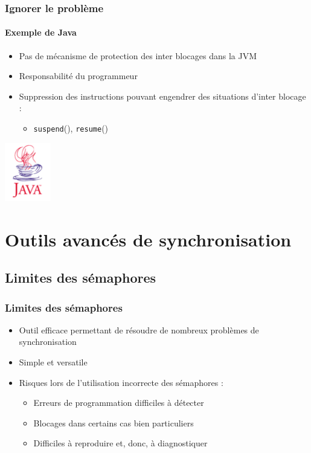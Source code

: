 \begin{frame}
\frametitle{Ignorer le problème}
\framesubtitle{Exemple de Java}
\begin{itemize}
\item Pas de mécanisme de protection des inter blocages dans la JVM
\item Responsabilité du programmeur
\item Suppression des instructions pouvant engendrer des situations d’inter blocage :
\begin{itemize}
\item \texttt{suspend}(), \texttt{resume}()
\end{itemize}
\end{itemize}
\includegraphics[width=2cm]{../illustration/java.png}
\end{frame}



\section{Outils avancés de synchronisation}

\subsection{Limites des sémaphores}
\begin{frame}
\frametitle{Limites des sémaphores}
\begin{itemize}
\item <1-> Outil efficace permettant de résoudre de nombreux problèmes de synchronisation
\item <1-> Simple et versatile
\item <2-> Risques lors de l’utilisation incorrecte des sémaphores :
\begin{itemize}
\item Erreurs de programmation difficiles à détecter
\item Blocages dans certains cas bien particuliers
\item Difficiles à reproduire et, donc, à diagnostiquer
\end{itemize}
\end{itemize}
\end{frame}

